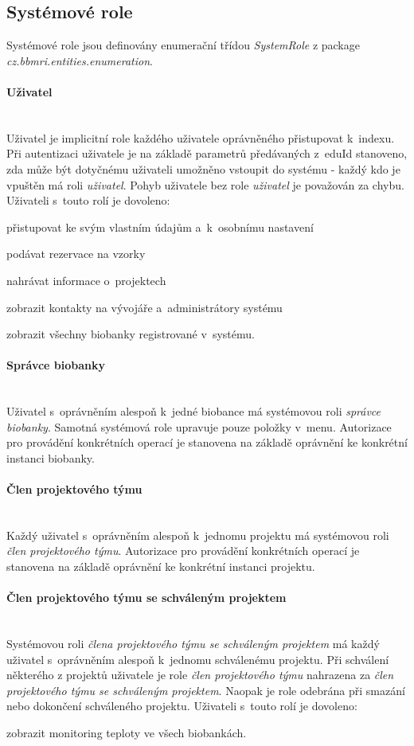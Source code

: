 \documentclass[11pt,draft,oneside]{fithesis2}
\newcommand{\paragraphNewLine}[1]{\paragraph*{#1}\mbox{}\\}
\begin{document}
\subsection{Systémové role}
Systémové role jsou definovány enumerační třídou \textit{SystemRole} z package \textit{cz.bbmri.entities.enumeration}. 

\paragraphNewLine{Uživatel}
Uživatel je implicitní role každého uživatele oprávněného přistupovat k~indexu. Při autentizaci uživatele je na základě parametrů předávaných z~eduId stanoveno, zda může být dotyčnému uživateli umožněno vstoupit do systému - každý kdo je vpuštěn má roli \textit{uživatel}. Pohyb uživatele bez role \textit{uživatel} je považován za chybu.
Uživateli s~touto rolí je dovoleno:
\begin{compactitem}
	\item přistupovat ke svým vlastním údajům a~k~osobnímu nastavení
	\item podávat rezervace na vzorky
	\item nahrávat informace o~projektech
	\item zobrazit kontakty na vývojáře a~administrátory systému
	\item zobrazit všechny biobanky registrované v~systému.
\end{compactitem}

\paragraphNewLine{Správce biobanky}
Uživatel s~oprávněním alespoň k~jedné biobance má systémovou roli \textit{správce biobanky}. Samotná systémová role upravuje pouze položky v~menu. Autorizace pro provádění konkrétních operací je stanovena na základě oprávnění ke konkrétní instanci biobanky. 

\paragraphNewLine{Člen projektového týmu} 
Každý uživatel s~oprávněním alespoň k~jednomu projektu má systémovou roli \textit{člen projektového týmu}. Autorizace pro provádění konkrétních operací je stanovena na základě oprávnění ke konkrétní instanci projektu. 

\paragraphNewLine{Člen projektového týmu se schváleným projektem}
Systémovou roli \textit{člena projektového týmu se schváleným projektem} má každý uživatel s~oprávněním alespoň k~jednomu schválenému projektu. Při schválení některého z projektů uživatele je role \textit{člen projektového týmu} nahrazena za \textit{člen projektového týmu se schváleným projektem}. Naopak je role odebrána při smazání nebo dokončení schváleného projektu.
Uživateli s~touto rolí je dovoleno:
\begin{compactitem}
	\item zobrazit monitoring teploty ve všech biobankách.
\end{compactitem}
\end{document}

